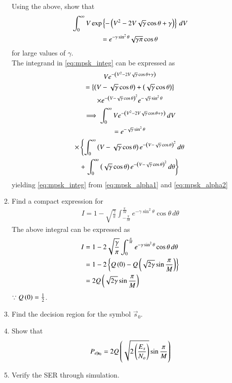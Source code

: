 \documentclass[journal,12pt,twocolumn]{IEEEtran}
\renewcommand\thesection{\arabic{section}}
\begin{document}
\begin{enumerate}[label=\thesection.\arabic*.,ref=\thesection.\theenumi]
Using the above, show that
%
\begin{multline}
\label{eq:mpsk_integ}
\int_{0}^{\infty}V\exp\left\{-\left(V^2 - 2V \sqrt{\gamma}\cos \theta +\gamma\right)\right\}\,dV
\\
= e^{-\gamma\sin^2 \theta} \sqrt{\gamma\pi}\cos \theta
\end{multline}
%
for large values of $\gamma$.
\\
\solution The integrand in \eqref{eq:mpsk_integ} can be expressed as
\begin{multline}
Ve^{-\left(V^2 - 2V \sqrt{\gamma}\cos \theta +\gamma\right)} 
\\
= \left\{\left(V - \sqrt{\gamma}\cos \theta\right) + \left(\sqrt{\gamma}\cos \theta\right)\right\}
\\
\times e^{-\left(V -  \sqrt{\gamma}\cos \theta \right)^2}e^{-  \sqrt{\gamma}\sin^2 \theta} 
\\
\implies \int_{0}^{\infty}Ve^{-\left(V^2 - 2V \sqrt{\gamma}\cos \theta +\gamma\right)}\,dV
\\
 = e^{-  \sqrt{\gamma}\sin^2 \theta}
\\
\times  \left\{\int_{0}^{\infty}\left(V - \sqrt{\gamma}\cos \theta\right)e^{-\left(V -  \sqrt{\gamma}\cos \theta \right)^2}\,d\theta\right.
\\
+ \left.\int_{0}^{\infty}\left(\sqrt{\gamma}\cos \theta\right)e^{-\left(V -  \sqrt{\gamma}\cos \theta \right)^2}\,d \theta\right\}
\end{multline}
%
yielding \eqref{eq:mpsk_integ} from \eqref{eq:mpsk_alpha1}
and \eqref{eq:mpsk_alpha2}


\item

Find a compact expression for
%
\begin{align}
I = 1 - \sqrt{\frac{\gamma}{\pi}}\int_{-\frac{\pi}{M}}^{\frac{\pi}{M}}e^{- \gamma\sin^2\theta }\cos \theta\, d\theta
\end{align}
\solution The above integral can be expressed as
%
\begin{align}
I &= 1 - 2\sqrt{\frac{\gamma}{\pi}}\int_{0}^{\frac{\pi}{M}}e^{- \gamma\sin^2\theta }\cos \theta\, d\theta
\\
&= 1 - 2 \left\{Q\left(0\right)-Q\left(\sqrt{2\gamma}\sin \frac{\pi}{M}\right)\right\}
\\
&= 2Q\left(\sqrt{2\gamma}\sin \frac{\pi}{M}\right)
\end{align}
$\because Q\left(0\right) = \frac{1}{2}$.
\item Find the decision region for the symbol $\vec{s}_0$.

\item

Show that
\begin{equation}
P_{e|\mathbf{s}_0}=2Q\left(\sqrt{2\left(\frac{{E_s}}{N_o}\right)}\sin \frac{\pi}{M}\right)
\end{equation}
\item

Verify the SER through simulation.
\end{enumerate}
%
\end{document}
